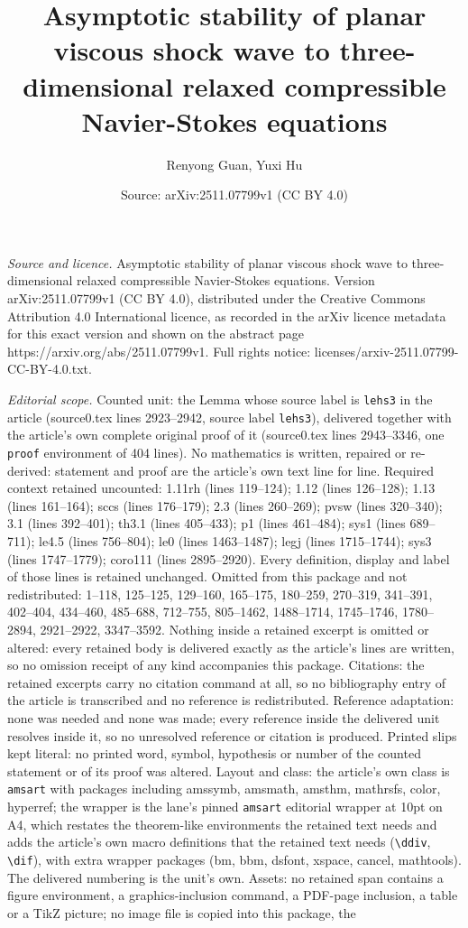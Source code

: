 \documentclass[10pt,a4paper]{amsart}
\title[Asymptotic stability of planar viscous shock wave to three-d]{Asymptotic stability of planar viscous shock wave to three-dimensional relaxed compressible Navier-Stokes equations}
\author{Renyong Guan, Yuxi Hu}
\date{Source: arXiv:2511.07799v1 (CC BY 4.0)}
\begin{document}
\maketitle

\noindent\emph{Source and licence.} Asymptotic stability of planar viscous shock wave to three-dimensional relaxed compressible Navier-Stokes equations. Version arXiv:2511.07799v1 (CC BY 4.0), distributed under the Creative Commons Attribution 4.0 International licence, as recorded in the arXiv licence metadata for this exact version and shown on the abstract page https://arxiv.org/abs/2511.07799v1. Full rights notice: licenses/arxiv-2511.07799-CC-BY-4.0.txt.\par\smallskip

\noindent\textit{Editorial scope.} Counted unit: the Lemma whose source label is \texttt{lehs3} in the article (source0.tex lines 2923--2942, source label \texttt{lehs3}), delivered together with the article's own complete original proof of it (source0.tex lines 2943--3346, one \texttt{proof} environment of 404 lines). No mathematics is written, repaired or re-derived: statement and proof are the article's own text line for line. Required context retained uncounted: 1.11rh (lines 119--124); 1.12 (lines 126--128); 1.13 (lines 161--164); sccs (lines 176--179); 2.3 (lines 260--269); pvsw (lines 320--340); 3.1 (lines 392--401); th3.1 (lines 405--433); p1 (lines 461--484); sys1 (lines 689--711); le4.5 (lines 756--804); le0 (lines 1463--1487); legj (lines 1715--1744); sys3 (lines 1747--1779); coro111 (lines 2895--2920). Every definition, display and label of those lines is retained unchanged. Omitted from this package and not redistributed: 1--118, 125--125, 129--160, 165--175, 180--259, 270--319, 341--391, 402--404, 434--460, 485--688, 712--755, 805--1462, 1488--1714, 1745--1746, 1780--2894, 2921--2922, 3347--3592. Nothing inside a retained excerpt is omitted or altered: every retained body is delivered exactly as the article's lines are written, so no omission receipt of any kind accompanies this package. Citations: the retained excerpts carry no citation command at all, so no bibliography entry of the article is transcribed and no reference is redistributed. Reference adaptation: none was needed and none was made; every reference inside the delivered unit resolves inside it, so no unresolved reference or citation is produced. Printed slips kept literal: no printed word, symbol, hypothesis or number of the counted statement or of its proof was altered. Layout and class: the article's own class is \texttt{amsart} with packages including amssymb, amsmath, amsthm, mathrsfs, color, hyperref; the wrapper is the lane's pinned \texttt{amsart} editorial wrapper at 10pt on A4, which restates the theorem-like environments the retained text needs and adds the article's own macro definitions that the retained text needs (\texttt{\textbackslash ddiv}, \texttt{\textbackslash dif}), with extra wrapper packages (bm, bbm, dsfont, xspace, cancel, mathtools). The delivered numbering is the unit's own. Assets: no retained span contains a figure environment, a graphics-inclusion command, a PDF-page inclusion, a table or a TikZ picture; no image file is copied into this package, the 
\end{document}
